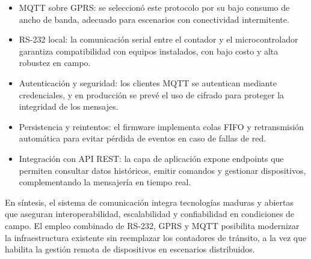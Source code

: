 \begin{itemize}
    \item MQTT sobre GPRS: se seleccionó este protocolo por su bajo consumo 
    de ancho de banda, adecuado para escenarios con conectividad intermitente.
    \item  RS-232 local: la comunicación serial entre el contador y el 
    microcontrolador garantiza compatibilidad con equipos instalados, con bajo costo 
    y alta robustez en campo.
    \item Autenticación y seguridad: los clientes MQTT se autentican mediante 
    credenciales, y en producción se prevé el uso de cifrado para proteger la 
    integridad de los mensajes.
    \item Persistencia y reintentos: el firmware implementa colas FIFO y 
    retransmisión automática para evitar pérdida de eventos en caso de fallas de red.
    \item Integración con API REST: la capa de aplicación expone endpoints 
    que permiten consultar datos históricos, emitir comandos y gestionar dispositivos, 
    complementando la mensajería en tiempo real.
\end{itemize}

En síntesis, el sistema de comunicación integra tecnologías maduras y abiertas que 
aseguran interoperabilidad, escalabilidad y confiabilidad en condiciones de campo. 
El empleo combinado de RS-232, GPRS y MQTT posibilita modernizar la infraestructura 
existente sin reemplazar los contadores de tránsito, a la vez que habilita la gestión 
remota de dispositivos en escenarios distribuidos.


